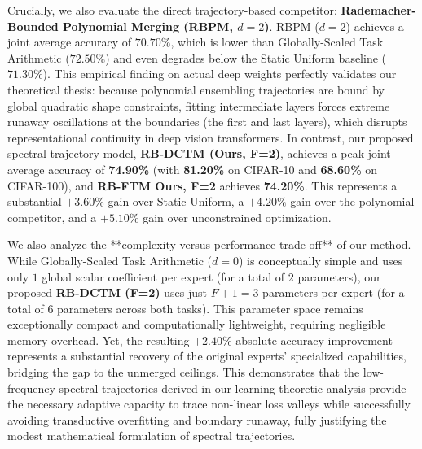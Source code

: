 Crucially, we also evaluate the direct trajectory-based competitor: \textbf{Rademacher-Bounded Polynomial Merging (RBPM, $d=2$)}. RBPM ($d=2$) achieves a joint average accuracy of $70.70\%$, which is lower than Globally-Scaled Task Arithmetic ($72.50\%$) and even degrades below the Static Uniform baseline ($71.30\%$). This empirical finding on actual deep weights perfectly validates our theoretical thesis: because polynomial ensembling trajectories are bound by global quadratic shape constraints, fitting intermediate layers forces extreme runaway oscillations at the boundaries (the first and last layers), which disrupts representational continuity in deep vision transformers. In contrast, our proposed spectral trajectory model, \textbf{RB-DCTM (Ours, F=2)}, achieves a peak joint average accuracy of \textbf{74.90\%} (with \textbf{81.20\%} on CIFAR-10 and \textbf{68.60\%} on CIFAR-100), and \textbf{RB-FTM Ours, F=2} achieves \textbf{74.20\%}. This represents a substantial $+3.60\%$ gain over Static Uniform, a $+4.20\%$ gain over the polynomial competitor, and a $+5.10\%$ gain over unconstrained optimization. 

We also analyze the **complexity-versus-performance trade-off** of our method. While Globally-Scaled Task Arithmetic ($d=0$) is conceptually simple and uses only $1$ global scalar coefficient per expert (for a total of $2$ parameters), our proposed \textbf{RB-DCTM (F=2)} uses just $F+1 = 3$ parameters per expert (for a total of $6$ parameters across both tasks). This parameter space remains exceptionally compact and computationally lightweight, requiring negligible memory overhead. Yet, the resulting $+2.40\%$ absolute accuracy improvement represents a substantial recovery of the original experts' specialized capabilities, bridging the gap to the unmerged ceilings. This demonstrates that the low-frequency spectral trajectories derived in our learning-theoretic analysis provide the necessary adaptive capacity to trace non-linear loss valleys while successfully avoiding transductive overfitting and boundary runaway, fully justifying the modest mathematical formulation of spectral trajectories.

